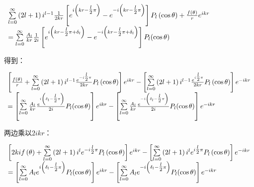 $\begin{array}{l}
 \sum\limits_{l = 0}^\infty  {\left( {2l + 1} \right)i^{l - 1} \frac{1}{{2kr}}\left[ {e^{i\left( {kr - {\textstyle{l \over 2}}\pi } \right)}  - e^{ - i\left( {kr - {\textstyle{l \over 2}}\pi } \right)} } \right]P_l \left( {\cos \theta } \right)}  + \frac{{f\left( \theta  \right)}}{r}e^{ikr}  \\
  = \sum\limits_{l = 0}^\infty  {\frac{{A_l }}{{kr}}\frac{1}{{2i}}\left[ {e^{i\left( {kr - {\textstyle{l \over 2}}\pi  + \delta _l } \right)}  - e^{ - i\left( {kr - {\textstyle{l \over 2}}\pi  + \delta _l } \right)} } \right]P_l (\cos \theta )}  \\
 \end{array}$





得到：

$\begin{array}{l}
 \left[ {\frac{{f\left( \theta  \right)}}{r} + \sum\limits_{l = 0}^\infty  {\left( {2l + 1} \right)i^{l - 1} \frac{{e^{ - i{\textstyle{l \over 2}}\pi } }}{{2kr}}P_l \left( {\cos \theta } \right)} } \right]e^{ikr}  - \left[ {\sum\limits_{l = 0}^\infty  {\left( {2l + 1} \right)i^{l - 1} \frac{{e^{i{\textstyle{l \over 2}}\pi } }}{{2kr}}P_l \left( {\cos \theta } \right)} } \right]e^{ - ikr}  \\
  = \left[ {\sum\limits_{l = 0}^\infty  {\frac{{A_l }}{{kr}}\frac{{e^{i\left( {\delta _l  - {\textstyle{l \over 2}}\pi } \right)} }}{{2i}}P_l (\cos \theta )} } \right]e^{ikr}  - \left[ {\sum\limits_{l = 0}^\infty  {\frac{{A_l }}{{kr}}\frac{{e^{ - i\left( {\delta _l  - {\textstyle{l \over 2}}\pi } \right)} }}{{2i}}P_l (\cos \theta )} } \right]e^{ - ikr}  \\
 \end{array}$


两边乘以$2ikr$：

$\begin{array}{l}
 \left[ {2kif\left( \theta  \right) + \sum\limits_{l = 0}^\infty  {\left( {2l + 1} \right)i^l e^{ - i{\textstyle{l \over 2}}\pi } P_l \left( {\cos \theta } \right)} } \right]e^{ikr}  - \left[ {\sum\limits_{l = 0}^\infty  {\left( {2l + 1} \right)i^l e^{i{\textstyle{l \over 2}}\pi } P_l \left( {\cos \theta } \right)} } \right]e^{ - ikr}  \\
  = \left[ {\sum\limits_{l = 0}^\infty  {A_l e^{i\left( {\delta _l  - {\textstyle{l \over 2}}\pi } \right)} P_l (\cos \theta )} } \right]e^{ikr}  - \left[ {\sum\limits_{l = 0}^\infty  {A_l e^{ - i\left( {\delta _l  - {\textstyle{l \over 2}}\pi } \right)} P_l (\cos \theta )} } \right]e^{ - ikr}  \\
 \end{array}$


